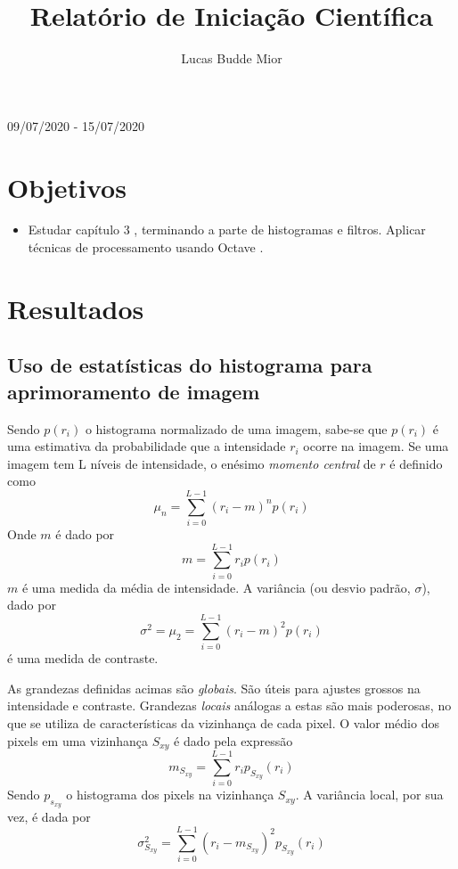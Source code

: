 \documentclass[a4paper,12pt,twoside]{article}
\title{Relatório de Iniciação Científica}
\author{Lucas Budde Mior}
\renewcommand{\maketitle}{
\begin{center}
{\Huge\bfseries
\thetitle}
\vspace{.25em}
\Large{09/07/2020 - 15/07/2020}
\end{center}
}
\begin{document}
\maketitle
\section{Objetivos}

\begin{itemize}
    \item{Estudar capítulo 3 \cite{gonzales}, terminando a parte de histogramas e filtros. Aplicar técnicas de processamento usando Octave \cite{octave}}. 
\end{itemize}

\section{Resultados}
\subsection{Uso de estatísticas do histograma para aprimoramento de imagem}
Sendo \(p(r_i)\) o histograma normalizado de uma imagem, sabe-se que \(p(r_i)\) é uma estimativa da probabilidade que a intensidade \(r_i\) ocorre na imagem.
Se uma imagem tem L níveis de intensidade, o enésimo \textit{momento central} de \(r\) é definido como
\begin{equation}\label{central}
    \mu_n = \sum_{i=0}^{L-1}{(r_i-m)^np(r_i)}
\end{equation}
Onde \(m\) é dado por
\begin{equation}\label{mean}
    m = \sum_{i=0}^{L-1}{r_ip(r_i)}
\end{equation}
\(m\) é uma medida da média de intensidade.
A variância (ou desvio padrão, \(\sigma\)), dado por
\begin{equation}\label{vari}
    \sigma^2 = \mu_2 = \sum_{i=0}^{L-1}(r_i-m)^2p(r_i)
\end{equation}
é uma medida de contraste.

As grandezas definidas acimas são \textit{globais}. 
São úteis para ajustes grossos na intensidade e contraste.
Grandezas \textit{locais} análogas a estas são mais poderosas, no que se utiliza de características da vizinhança de cada pixel.
O valor médio dos pixels em uma vizinhança \(S_{xy}\) é dado pela expressão
\begin{equation}\label{locmed}
    m_{S_{xy}} = \sum_{i=0}^{L-1}{r_ip_{S_{xy}}(r_i)}
\end{equation}
Sendo \(p_{s_{xy}}\) o histograma dos pixels na vizinhança \(S_{xy}\). 
A variância local, por sua vez, é dada por
\begin{equation}\label{locvar}
    \sigma^2_{S_{xy}} = \sum_{i=0}^{L-1}{(r_i-m_{S_{xy}})^2p_{S_{xy}}(r_i)}
\end{equation}
\end{document}
